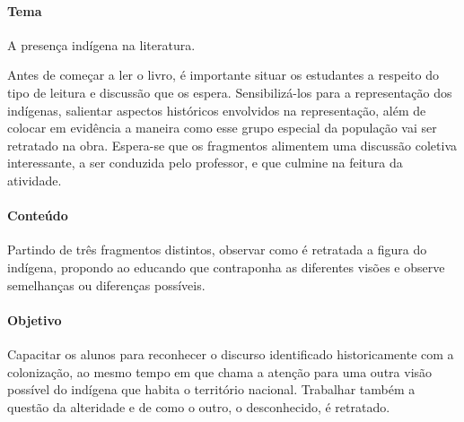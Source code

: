 \documentclass[12pt]{extarticle}
\begin{document}
\paragraph{Tema} A presença indígena na literatura.


Antes de começar a ler o livro, é importante situar os estudantes a
respeito do tipo de leitura e discussão que os espera. Sensibilizá-los
para a representação dos indígenas, salientar aspectos históricos
envolvidos na representação, além de colocar em evidência a maneira como
esse grupo especial da população vai ser retratado na obra. Espera-se
que os fragmentos alimentem uma discussão coletiva interessante, a ser
conduzida pelo professor, e que culmine na feitura da atividade.

\paragraph{Conteúdo}  
Partindo de três fragmentos distintos, observar como é retratada a
figura do indígena, propondo ao educando que contraponha as diferentes
visões e observe semelhanças ou diferenças possíveis.

\paragraph{Objetivo}
Capacitar os alunos para reconhecer o discurso identificado
historicamente com a colonização, ao mesmo tempo em que chama a
atenção para uma outra visão possível do indígena que habita o
território nacional. Trabalhar também a questão da alteridade e de
como o outro, o desconhecido, é retratado.
\end{document}
